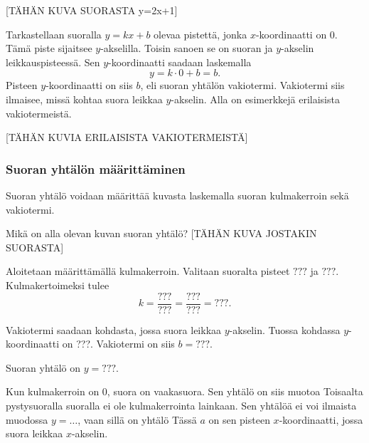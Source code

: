 [TÄHÄN KUVA SUORASTA y=2x+1]

Tarkastellaan suoralla $y=kx+b$ olevaa pistettä, jonka $x$-koordinaatti on 0.
Tämä piste sijaitsee $y$-akselilla. Toisin sanoen se on suoran ja $y$-akselin leikkauspisteessä.
Sen $y$-koordinaatti saadaan laskemalla
\[
y=k\cdot 0+b=b.
\]
Pisteen $y$-koordinaatti on siis $b$, eli suoran yhtälön vakiotermi. Vakiotermi siis ilmaisee, missä kohtaa suora leikkaa $y$-akselin.
Alla on esimerkkejä erilaisista vakiotermeistä.

[TÄHÄN KUVIA ERILAISISTA VAKIOTERMEISTÄ]

\subsubsection*{Suoran yhtälön määrittäminen}

Suoran yhtälö voidaan määrittää kuvasta laskemalla suoran kulmakerroin sekä vakiotermi.

\begin{esimerkki} Mikä on alla olevan kuvan suoran yhtälö?
[TÄHÄN KUVA JOSTAKIN SUORASTA]
\begin{esimratk}
Aloitetaan määrittämällä kulmakerroin. Valitaan suoralta pisteet $???$ ja $???$. Kulmakertoimeksi tulee
\[
k=\frac{???}{???}=\frac{???}{???}=???.
\]
\end{esimratk}
Vakiotermi saadaan kohdasta, jossa suora leikkaa $y$-akselin. Tuossa kohdassa $y$-koordinaatti on ???. Vakiotermi on siis $b=???$.
\begin{esimvast}
Suoran yhtälö on $y=???$.
\end{esimvast}
\end{esimerkki}

Kun kulmakerroin on 0, suora on vaakasuora. Sen yhtälö on siis muotoa
\laatikko{
\[
y=b.
\]
}
Toisaalta pystysuoralla suoralla ei ole kulmakerrointa lainkaan. Sen yhtälöä ei voi ilmaista muodossa $y=\dots$, vaan sillä on yhtälö
\laatikko{
\[
x=a.
\]
}
Tässä $a$ on sen pisteen $x$-koordinaatti, jossa suora leikkaa $x$-akselin.
